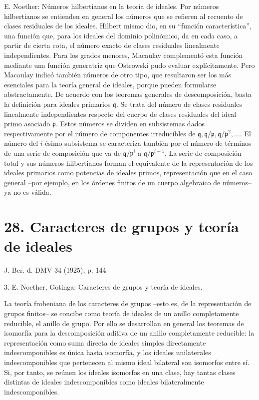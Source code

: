 \documentclass[11pt]{article}
\begin{document}
E. Noether: Números hilbertianos en la teoría de ideales. Por números hilbertianos se entienden en general los números que se refieren al recuento de clases residuales de los ideales. Hilbert mismo dio, en su ``función característica'', una función que, para los ideales del dominio polinómico, da en cada caso, a partir de cierta cota, el número exacto de clases residuales linealmente independientes. Para los grados menores, Macaulay complementó esta función mediante una función generatriz que Ostrowski pudo evaluar explícitamente. Pero Macaulay indicó también números de otro tipo, que resultaron ser los más esenciales para la teoría general de ideales, porque pueden formularse abstractamente. De acuerdo con los teoremas generales de descomposición, basta la definición para ideales primarios $\mathfrak q$. Se trata del número de clases residuales linealmente independientes respecto del cuerpo de clases residuales del ideal primo asociado $\mathfrak p$. Estos números se dividen en subsistemas dados respectivamente por el número de componentes irreducibles de $\mathfrak q,\mathfrak q/\mathfrak p,\mathfrak q/\mathfrak p^2,\ldots$. El número del $i$-ésimo subsistema se caracteriza también por el número de términos de una serie de composición que va de $\mathfrak q/\mathfrak p^i$ a $\mathfrak q/\mathfrak p^{i-1}$. La serie de composición total y sus números hilbertianos forman el equivalente de la representación de los ideales primarios como potencias de ideales primos, representación que en el caso general --por ejemplo, en los órdenes finitos de un cuerpo algebraico de números-- ya no es válida.

\section*{28. Caracteres de grupos y teoría de ideales}

\begin{center}
J. Ber. d. DMV 34 (1925), p. 144
\end{center}

3. E. Noether, Gotinga: Caracteres de grupos y teoría de ideales.

La teoría frobeniana de los caracteres de grupos --esto es, de la representación de grupos finitos-- se concibe como teoría de ideales de un anillo completamente reducible, el anillo de grupo. Por ello se desarrollan en general los teoremas de isomorfía para la descomposición aditiva de un anillo completamente reducible: la representación como suma directa de ideales simples directamente indescomponibles es única hasta isomorfía, y los ideales unilaterales indescomponibles que pertenecen al mismo ideal bilateral son isomorfos entre sí. Si, por tanto, se reúnen los ideales isomorfos en una clase, hay tantas clases distintas de ideales indescomponibles como ideales bilateralmente indescomponibles.
\end{document}
